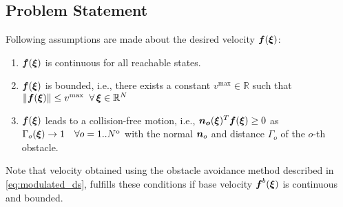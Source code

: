 \subsection{Problem Statement}
Following assumptions are made about the desired velocity $\boldsymbol{f}(\boldsymbol{\xi})$:
\begin{enumerate}
    \item $\boldsymbol{f}(\boldsymbol{\xi})$ is continuous for all reachable states.
    \item $\boldsymbol{f}(\boldsymbol{\xi})$ is bounded, i.e., there exists a constant $v^{\mathrm{max}} \in \mathbb{R}$ such that $\| \boldsymbol{f}(\boldsymbol{\xi}) \| \leq v^{\mathrm{max}} \;\; \forall \, \boldsymbol{\xi} \in \mathbb{R}^N$
    \item $\boldsymbol{f}(\boldsymbol{\xi})$ leads to a collision-free motion, i.e., $\boldsymbol{n_o}(\boldsymbol{\xi})^T \boldsymbol{f}(\boldsymbol{\xi}) \geq 0$ as $\Gamma_o(\boldsymbol{\xi}) \rightarrow 1 \quad \forall o = 1 .. N^{\mathrm{o}}$ with the normal $\boldsymbol{n}_o$ and distance $\Gamma_o$ of the $o$-th obstacle. 
\end{enumerate}

Note that velocity obtained using the obstacle avoidance method described in \eqref{eq:modulated_ds}, fulfills these conditions if base velocity $\boldsymbol{f}^b(\boldsymbol{\xi})$ is continuous and bounded.
